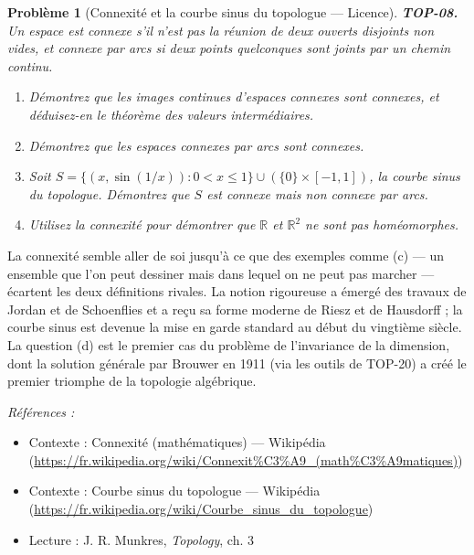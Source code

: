 \documentclass[11pt]{article}
\newtheorem{problem}{Problème}
\newenvironment{refs}{\par\small\noindent\emph{Références :}\begin{itemize}\setlength\itemsep{0pt}}{\end{itemize}\normalsize}
\begin{document}
\bigskip

\begin{problem}[{Connexité et la courbe sinus du topologue --- Licence}]
\textbf{TOP-08.} Un espace est \textit{connexe} s'il n'est pas la réunion de deux ouverts disjoints
non vides, et \textit{connexe par arcs} si deux points quelconques sont joints par un chemin
continu.
\begin{enumerate}
\item[(a)] Démontrez que les images continues d'espaces connexes sont connexes, et déduisez-en le théorème
des valeurs intermédiaires.
\item[(b)] Démontrez que les espaces connexes par arcs sont connexes.
\item[(c)] Soit $ S = \{ (x, \sin(1/x)) : 0 < x \le 1 \} \cup (\{0\} \times [-1,1]) $, la courbe sinus
du topologue. Démontrez que $ S $ est connexe mais non connexe par arcs.
\item[(d)] Utilisez la connexité pour démontrer que $\mathbb{R}$ et $ \mathbb{R}^2 $ ne sont pas
homéomorphes.
\end{enumerate}

\end{problem}

\noindent La connexité semble aller de soi jusqu'à ce que des exemples comme (c) --- un ensemble
que l'on peut dessiner mais dans lequel on ne peut pas marcher --- écartent les deux définitions rivales.
La notion rigoureuse a émergé des travaux de Jordan et de Schoenflies et a reçu sa forme moderne de Riesz
et de Hausdorff ; la courbe sinus est devenue la mise en garde standard au début du vingtième siècle. La
question (d) est le premier cas du problème de l'invariance de la dimension, dont la solution générale
par Brouwer en 1911 (via les outils de TOP-20) a créé le premier triomphe de la topologie
algébrique.

\begin{refs}
\item Contexte : Connexité (mathématiques) --- Wikipédia (\url{https://fr.wikipedia.org/wiki/Connexit%C3%A9_(math%C3%A9matiques)})
\item Contexte : Courbe sinus du topologue --- Wikipédia (\url{https://fr.wikipedia.org/wiki/Courbe_sinus_du_topologue})
\item Lecture : J. R. Munkres, \textit{Topology}, ch. 3
\end{refs}

\bigskip
\end{document}
